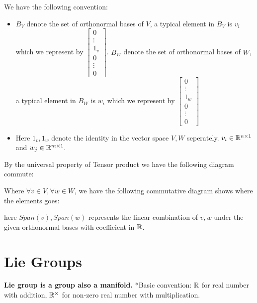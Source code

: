 \documentclass[11pt]{article}
\begin{document}
We have the following convention:
\begin{itemize}
\item \(B_V\) denote the set of orthonormal bases of \(V\), a typical element in \(B_V\) is \(v_i\) which we represent by \(\begin{bmatrix} 0 \\ \vdots \\ 1_v \\ 0 \\ \vdots \\ 0 \end{bmatrix}\). \(B_W\) denote the set of orthonormal bases of \(W\), a typical element in \(B_W\) is \(w_i\) which we represent by \(\begin{bmatrix} 0 \\ \vdots \\ 1_w \\ 0 \\ \vdots \\ 0 \end{bmatrix}\)

\item Here \(1_v, 1_w\) denote the identity in the vector space \(V, W\) seperately. \(v_i \in \mathbb{R}^{n\times 1}\) and \(w_j \in \mathbb{R}^{m\times 1}\).
\end{itemize}

By the universal property of Tensor product we have the following diagram commute:
\begin{center}\end{center}

Where \(\forall v \in V, \forall w \in W\), we have the following commutative diagram shows where the elements goes:

\begin{center}\end{center}

here \(Span(v), Span(w)\) represents the linear combination of \(v,w\) under the given orthonormal bases with coefficient in \(\mathbb{R}\).
\section{Lie Groups}
\label{sec:org0b109f1}
\textbf{Lie group is a group also a manifold.}
*Basic convention: \(\mathbb{R}\) for real number with addition, \(\mathbb{R}^{\times}\) for non-zero real number with multiplication.
\end{document}
